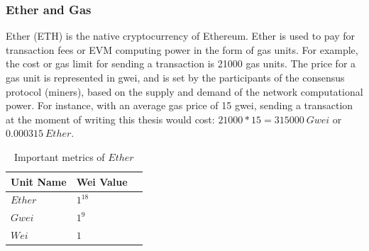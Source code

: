 \documentclass[11pt,a4paper]{report}
\begin{document}
\subsubsection{Ether and Gas}\label{sec:gas}
Ether (ETH) is the native cryptocurrency of Ethereum. Ether is used to pay for transaction fees or EVM computing power in the form of gas units. For example, the cost or gas limit for sending a transaction is 21000 gas units\cite{wood2014ethereum-Fee}. The price for a gas unit is represented in gwei, and is set by the participants of the consensus protocol (miners), based on the supply and demand of the network computational power\cite{book:masteringETH-gas}.
For instance, with an average gas price of 15 gwei\cite{gastracker}, sending a transaction at the moment of writing this thesis would cost: $21000*15 = 315000~Gwei$ or $0.000315~Ether.$
\begin{table}[htp]
\centering
\begin{tabular}{|l|l|l|}
	\hline
	\multicolumn{1}{|c|}{\textbf{Unit Name}} & 
	\multicolumn{1}{|c|}{\textbf{Wei Value}} \\\hline
	$Ether$ & $1^{18}$  \\\hline
	$Gwei$  & $1^{9}$  \\\hline
	$Wei$   & $1$     \\\hline   
\end{tabular}
\caption{Important metrics of $Ether$}
\label{tab:Ether_metrics}
\end{table}
\end{document}
